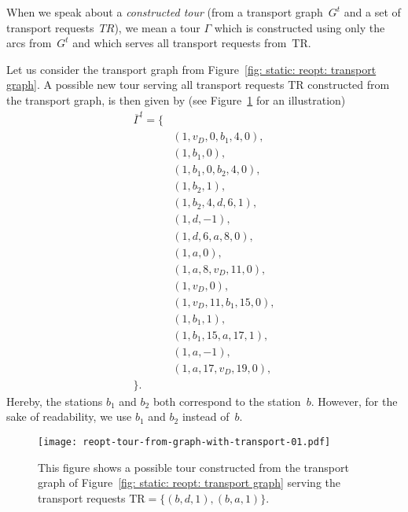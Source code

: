 \documentclass[english]{llncs}
\numberwithin{sublemma}{lemma}
\newcommand{\tourd}{\ensuremath{\Gamma}}
\newcommand{\TR}{\mathrm{TR}}
\begin{document}
When we speak about a \emph{constructed tour} (from a transport graph~$G^t$ and a set of transport requests~$TR$),
we mean a tour ${\tourd}$ which is constructed using only the arcs from~$G^t$ and which serves all transport requests from~$\TR$.


\begin{example}\label{ex: static: reopt: tour from transport graph}
Let us consider the transport graph from Figure~\ref{fig: static: reopt: transport graph}.
A possible new tour serving all transport requests $\TR$ constructed from the transport graph, is then given by (see Figure~\ref{fig: static: reopt: tour from transport graph} for an illustration)
\begin{align*}
 \overline{\tourd}^t = \{& \\
            & (1, v_D, 0, b_1, 4, 0), \\
            & (1, b_1, 0), \\
            & (1, b_1, 0, b_2, 4, 0), \\
            & (1, b_2, 1), \\
            & (1, b_2, 4, d, 6, 1), \\
            & (1, d, -1), \\
            & (1, d, 6, a, 8, 0), \\
            & (1, a, 0), \\ 
            & (1, a, 8, v_D, 11, 0), \\
            & (1, v_D, 0), \\ 
            & (1, v_D, 11, b_1, 15, 0), \\
            & (1, b_1, 1), \\
            & (1, b_1, 15, a, 17, 1), \\
            & (1, a, -1), \\
            & (1, a, 17, v_D, 19, 0), \\
          \}.&
\end{align*}
Hereby, the stations $b_1$ and $b_2$ both correspond to the station~$b$.
However, for the sake of readability, we use $b_1$ and $b_2$ instead of~$b$.
\begin{figure}[ht]
    \centering
    \texttt{[image: reopt-tour-from-graph-with-transport-01.pdf]}
 \caption{
  This figure shows a possible tour constructed from the transport graph of Figure~\ref{fig: static: reopt: transport graph} serving the transport requests $\TR = \{ (b, d, 1), (b, a, 1) \}$.
 }
 \label{fig: static: reopt: tour from transport graph}
\end{figure}
\end{example}
\end{document}

